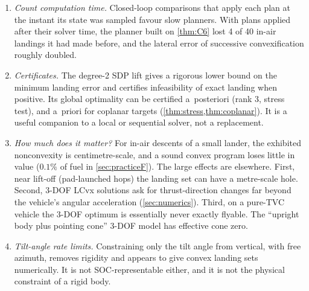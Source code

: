 \begin{enumerate}[leftmargin=*,itemsep=3pt]
in centre-of-mass coordinates, where attitude and thrust multiply. In centre-of-percussion coordinates the dynamics are linear, and
restricting the actuator limits instead of relaxing them gives one SOCP whose plans are all flyable at every instant (\cref{thm:F}).
What it gives up is measured in \cref{sec:practiceF}: $0.1\%$ of fuel at the operating point and a few tenths of a second of
minimum flight time, concentrated in manoeuvres that tilt in order to shed thrust. Because it needs no initial trajectory, trust
region or iteration budget and solves in tens of milliseconds, it can replan at the control system's own time scale, and in our
simulations that mattered more for touchdown accuracy than the last fraction of a percent of optimality. For a new gimballed vehicle
we would start here and keep successive convexification for the manoeuvres this program refuses.
\item \emph{Count computation time.} Closed-loop comparisons that apply each plan at the instant its state was sampled favour slow
planners. With plans applied after their solver time, the planner built on \cref{thm:C6} lost 4 of 40 in-air landings it had made
before, and the lateral error of successive convexification roughly doubled.
\item \emph{Certificates.} The degree-2 SDP lift gives a rigorous lower bound on the minimum landing error and certifies
infeasibility of exact landing when positive. Its global optimality can be certified a~posteriori (rank 3, stress test), and
a~priori for coplanar targets (\cref{thm:stress,thm:coplanar}). It is a useful companion to a local or sequential solver, not a
replacement.
\item \emph{How much does it matter?} For in-air descents of a small lander, the exhibited nonconvexity is centimetre-scale, and
a sound convex program loses little in value ($0.1\%$ of fuel in \cref{sec:practiceF}). The large effects are elsewhere. First, near
lift-off (pad-launched hops) the landing set can have a metre-scale hole. Second, 3-DOF LCvx solutions ask for thrust-direction
changes far beyond the vehicle's angular acceleration (\cref{sec:numerics}). Third, on a pure-TVC vehicle the 3-DOF optimum is
essentially never exactly flyable. The ``upright body plus pointing cone'' 3-DOF model has effective cone zero.
\item \emph{Tilt-angle rate limits.} Constraining only the tilt angle from vertical, with free azimuth, removes rigidity and
appears to give convex landing sets numerically. It is not SOC-representable either, and it is not the physical constraint
of a rigid body.
\end{enumerate}

